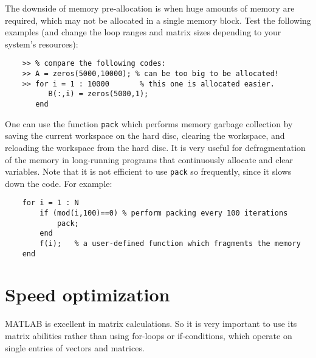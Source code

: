 \documentclass[10pt,a4paper]{article}
\newcounter{example}[section]
\begin{document}
The downside of memory pre-allocation is when huge amounts of memory are required, which may not be allocated in a single memory block. Test the following examples (and change the loop ranges and matrix sizes depending to your system's resources):
\begin{lstlisting}
	>> % compare the following codes:
	>> A = zeros(5000,10000); % can be too big to be allocated!
	>> for i = 1 : 10000       % this one is allocated easier.
	      B(:,i) = zeros(5000,1);
	   end
\end{lstlisting}
One can use the function \texttt{pack} which performs memory garbage collection by saving the current workspace on the hard disc, clearing the workspace, and reloading the workspace from the hard disc. It is very useful for defragmentation of the memory in long-running programs that continuously allocate and clear variables. Note that it is not efficient to use \texttt{pack} so frequently, since it slows down the code. For example:
\begin{lstlisting}
	for i = 1 : N
		if (mod(i,100)==0) % perform packing every 100 iterations
			pack;
		end
		f(i);	% a user-defined function which fragments the memory
	end
\end{lstlisting}
\section{Speed optimization}
\label{sec:speed}
MATLAB is excellent in matrix calculations. So it is very important to use its matrix abilities rather than using for-loops or if-conditions, which operate on single entries of vectors and matrices.
\end{document}
